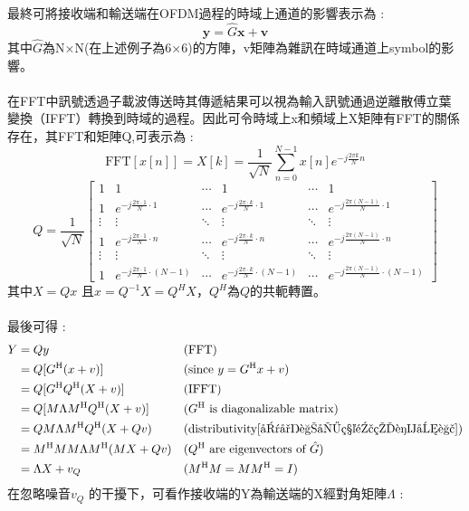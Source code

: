 \documentclass[12pt,a4paper]{article} %
\begin{document}
最終可將接收端和輸送端在OFDM過程的時域上通道的影響表示為 :
\[\mathbf{y} = \hat{G} \mathbf{x} + \mathbf{v}\]
其中$\hat{G}$為N×N(在上述例子為6×6)的方陣，v矩陣為雜訊在時域通道上symbol的影響\cite{goldsmith2005wireless}。\\
\\
在FFT中訊號透過子載波傳送時其傳遞結果可以視為輸入訊號通過逆離散傅立葉變換（IFFT）轉換到時域的過程。因此可令時域上x和頻域上X矩陣有FFT的關係存在，其FFT和矩陣Q\cite{goldsmith2005wireless},\cite{OFDM正交分頻多工系統2}可表示為 :
\[\text{FFT}[x[n]] = X[k] = \frac{1}{\sqrt{N}} \sum_{n=0}^{N-1} x[n] e^{-j \frac{2\pi k}{N} n}\]
\[Q = \frac{1}{\sqrt{N}} 
\begin{bmatrix}
1 & 1 & \cdots & 1 & \cdots & 1 \\
1 & e^{-j \frac{2\pi \cdot 1}{N} \cdot 1} & \cdots & e^{-j \frac{2\pi \cdot k}{N} \cdot 1} & \cdots & e^{-j \frac{2\pi (N-1)}{N} \cdot 1} \\
\vdots & \vdots & \ddots & \vdots & \ddots & \vdots \\
1 & e^{-j \frac{2\pi \cdot 1}{N} \cdot n} & \cdots & e^{-j \frac{2\pi \cdot k}{N} \cdot n} & \cdots & e^{-j \frac{2\pi (N-1)}{N} \cdot n} \\
\vdots & \vdots & \ddots & \vdots & \ddots & \vdots \\
1 & e^{-j \frac{2\pi \cdot 1}{N} \cdot (N-1)} & \cdots & e^{-j \frac{2\pi \cdot k}{N} \cdot (N-1)} & \cdots & e^{-j \frac{2\pi (N-1)}{N} \cdot (N-1)}
\end{bmatrix}\]
其中$X=Qx$ 且$x = Q^{-1} X = Q^H X$，$Q^H$為$Q$的共軛轉置\cite{goldsmith2005wireless}。\\
\\
最後可得 : 
\begin{align*}
Y &= Qy &&\text{(FFT)} \\
&= Q[G^\text{H}(x+v)] &&\text{(since } y = G^\text{H}x+v) \\
&= Q[G^\text{H}Q^\text{H}(X+v)] &&\text{(IFFT)} \\
&= Q[M\Lambda M^\text{H}Q^\text{H}(X+v)] &&\text{(} G^\text{H} \text{ is diagonalizable matrix)} \\
&= QM\Lambda M^\text{H}Q^\text{H}(X+Qv) &&\text{(distributivity\cite{可對角化矩陣的譜分解})} \\
&= M^\text{H}MM\Lambda M^\text{H}(MX+Qv) &&\text{(} Q^\text{H} \text{ are eigenvectors of } {\hat{G}}) \\
&= \Lambda X + v_Q &&\text{(} M^\text{H}M=MM^\text{H}=I\text{)}
\end{align*}
在忽略噪音$v_Q$ 的干擾下，可看作接收端的Y為輸送端的X經對角矩陣$\Lambda$ :
\end{document}
